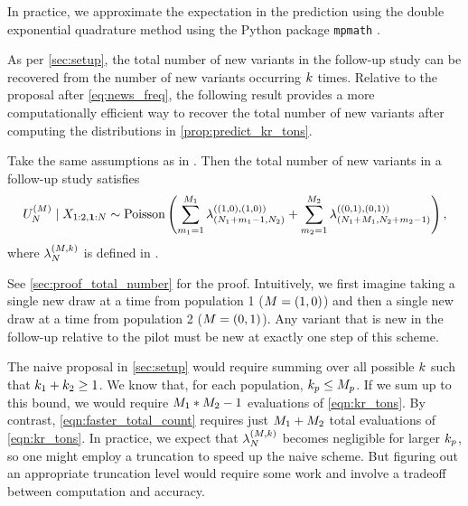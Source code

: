 In practice, we approximate the expectation in the prediction using the double exponential quadrature method \citep{takahasi1974double} using the Python package \texttt{mpmath} \citep{mpmath}.

As per \cref{sec:setup}, the total number of new variants in the follow-up study can be recovered from the number
of new variants occurring $\vecoccurrence$ times. Relative to the proposal after \cref{eq:news_freq}, 
the following result provides a more computationally efficient way to 
recover the total number of new variants after computing the distributions in \cref{prop:predict_kr_tons}.
\begin{myProposition}
\label{coro:new_vars}
	Take the same assumptions as in . Then the total number of new variants in a follow-up study satisfies
\begin{align} \label{eqn:faster_total_count}
     \genericnews \mid \pilotdata \sim \Pois\left(\sum_{\followupidx{1}=1}^{\futuresamplesize{1}}\newsparam{(\samplesize{1}+\followupidx{1}-1,\samplesize{2})}{(1,0),(1,0)}+\sum_{\followupidx{2}=1}^{\futuresamplesize{2}} \newsparam{(\samplesize{1}+\futuresamplesize{1},\samplesize{2}+\followupidx{2}-1)}{(0,1),(0,1)} \right),
\end{align} 
where $\genericfreqnewsparam$ is defined in .
\end{myProposition}


See \cref{sec:proof_total_number} for the proof. Intuitively, we first imagine taking a single new draw at a time from population 1 ($\vecfuturesamplesize = (1,0)$) and then a single new draw at a time from population 2 ($\vecfuturesamplesize = (0,1)$). Any variant that is new in the follow-up relative to the pilot must be new at exactly one step of this scheme.

The naive proposal in \cref{sec:setup} would require summing over all possible $\vecoccurrence$ such that $k_{1} + k_{2} \ge 1$. We know that, for each population, $k_{p} \le M_{p}$. If we sum up to this bound, we would require $M_{1} * M_{2} - 1$ evaluations of \cref{eqn:kr_tons}. By contrast, \cref{eqn:faster_total_count} requires just $M_{1} + M_{2}$ total evaluations of \cref{eqn:kr_tons}. In practice, we expect that $\genericfreqnewsparam$ becomes negligible for larger $k_{p}$, so one might employ a truncation to speed up the naive scheme. But figuring out an appropriate truncation level would require some work and involve a tradeoff between computation and accuracy.
